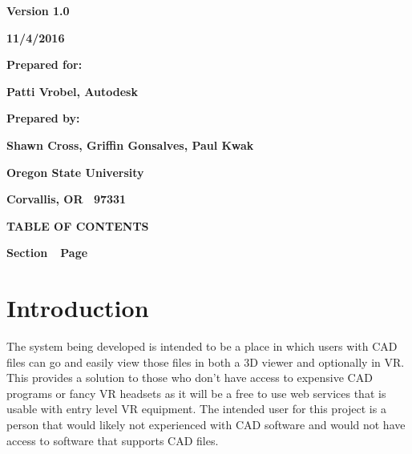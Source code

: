 \documentclass[letterpaper, 10pt, draftclsnofoot, compsoc, onecolumn]{IEEEtran}
\begin{document}
\bigskip
\bigskip
\bigskip

\begin{figure}
\centering
\end{figure}

\bigskip
\bigskip

{\centering{}\bfseries\color{black}
Version 1.0
\par}

{\centering{}\bfseries\color{black}
11/4/2016
\par}


\bigskip
\bigskip

{\centering{}\bfseries\color{black}
Prepared for:
\par}

{\centering{}\bfseries\color{black}
Patti Vrobel, Autodesk
\par}


\bigskip
\bigskip

{\centering{}\bfseries\color{black}
Prepared by:  
\par}

{\centering{}\bfseries\color{black}
Shawn Cross, Griffin Gonsalves, Paul Kwak
\par}

{\centering{}\bfseries\color{black}
Oregon State University
\par}

{\centering{}\bfseries\color{black}
Corvallis, OR \ 97331
\par}


{\centering{}\bfseries\color{black}
TABLE OF CONTENTS
\par}

\bigskip

{\bfseries\color{black}
Section\ \ Page}

\setcounter{tocdepth}{9}
\renewcommand\contentsname{}
\tableofcontents

\bigskip
\clearpage

\section[Introduction]{\rmfamily\bfseries\color{black}
Introduction}
	The system being developed is intended to be a place in which users with CAD files can go and easily view those files 
	in both a 3D viewer and optionally in VR. This provides a solution to those who don't have access to expensive CAD 
	programs or fancy VR headsets as it will be a free to use web services that is usable with entry level VR equipment. 
	The intended user for this project is a person that would likely not experienced with CAD software and would not have 
	access to software that supports CAD files.  
\end{document}

